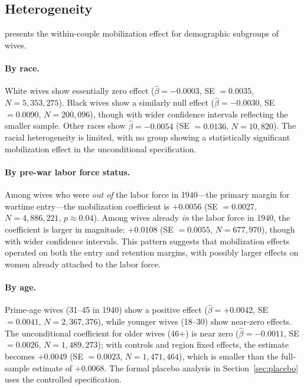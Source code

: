 \documentclass[12pt]{article}
\begin{document}


\subsection{Heterogeneity}

 presents the within-couple mobilization effect for demographic subgroups of wives.

\paragraph{By race.} White wives show essentially zero effect ($\hat{\beta} = -0.0003$, SE $= 0.0035$, $N = 5{,}353{,}275$). Black wives show a similarly null effect ($\hat{\beta} = -0.0030$, SE $= 0.0090$, $N = 200{,}096$), though with wider confidence intervals reflecting the smaller sample. Other races show $\hat{\beta} = -0.0054$ (SE $= 0.0136$, $N = 10{,}820$). The racial heterogeneity is limited, with no group showing a statistically significant mobilization effect in the unconditional specification.

\paragraph{By pre-war labor force status.} Among wives who were \textit{out of} the labor force in 1940---the primary margin for wartime entry---the mobilization coefficient is $+0.0056$ (SE $= 0.0027$, $N = 4{,}886{,}221$, $p \approx 0.04$). Among wives already \textit{in} the labor force in 1940, the coefficient is larger in magnitude: $+0.0108$ (SE $= 0.0055$, $N = 677{,}970$), though with wider confidence intervals. This pattern suggests that mobilization effects operated on both the entry and retention margins, with possibly larger effects on women already attached to the labor force.

\paragraph{By age.} Prime-age wives (31--45 in 1940) show a positive effect ($\hat{\beta} = +0.0042$, SE $= 0.0041$, $N = 2{,}367{,}376$), while younger wives (18--30) show near-zero effects. The unconditional coefficient for older wives (46+) is near zero ($\hat{\beta} = -0.0011$, SE $= 0.0026$, $N = 1{,}489{,}273$); with controls and region fixed effects, the estimate becomes $+0.0049$ (SE $= 0.0023$, $N = 1{,}471{,}464$), which is smaller than the full-sample estimate of $+0.0068$. The formal placebo analysis in Section~\ref{sec:placebo} uses the controlled specification.
\end{document}
